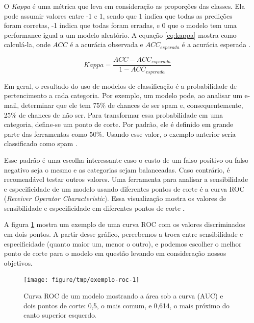 \documentclass[a4paper,titlepage]{ppgi}\usepackage[]{graphicx}\usepackage[]{color}
\newenvironment{knitrout}{}{} %
\begin{document}
O \emph{Kappa} é uma métrica que leva em consideração as proporções das
classes. Ela pode assumir valores entre -1 e 1, sendo que 1 indica que todas as
predições foram corretas, -1 indica que todas foram erradas, e 0 que o modelo
tem uma performance igual a um modelo aleatório. A equação \ref{eq:kappa}
mostra como calculá-la, onde $ACC$ é a acurácia observada e $ACC_{esperada}$ é
a acurácia esperada \cite{Cohen1960}.

\begin{equation}
\label{eq:kappa}
Kappa = \frac{ACC - ACC_{esperada}}{1 - ACC_{esperada}}
\end{equation}

Em geral, o resultado do uso de modelos de classificação é a probabilidade de
pertencimento a cada categoria. Por exemplo, um modelo pode, ao analisar um
e-mail, determinar que ele tem 75\% de chances de ser spam e, consequentemente,
25\% de chances de não ser. Para transformar essa probabilidade em uma
categoria, define-se um ponto de corte. Por padrão, ele é definido em grande
parte das ferramentas como 50\%. Usando esse valor, o exemplo anterior seria
classificado como spam \cite{Kuhn2013}.

Esse padrão é uma escolha interessante caso o custo de um falso positivo ou
falso negativo seja o mesmo e as categorias sejam balanceadas. Caso contrário,
é recomendável testar outros valores. Uma ferramenta para analisar a
sensibilidade e especificidade de um modelo usando diferentes pontos de corte é
a curva ROC (\emph{Receiver Operator Characteristic}). Essa visualização mostra
os valores de sensibilidade e especificidade em diferentes pontos de corte
\cite{Altman1994,Brown2006,Fawcett2006}.

A figura \ref{fig:exemplo-roc} mostra um exemplo de uma curva ROC com os
valores discriminados em dois pontos. A partir desse gráfico, percebemos a
troca entre sensibilidade e especificidade (quanto maior um, menor o outro), e
podemos escolher o melhor ponto de corte para o modelo em questão levando em
consideração nossos objetivos.

\begin{knitrout}
\color{fgcolor}\begin{figure}
\texttt{[image: figure/tmp/exemplo-roc-1]} \caption[Curva ROC de um modelo mostrando a área sob a curva (AUC) e dois pontos de corte]{Curva ROC de um modelo mostrando a área sob a curva (AUC) e dois pontos de corte: 0,5, o mais comum, e 0,614, o mais próximo do canto superior esquerdo.}\label{fig:exemplo-roc}
\end{figure}


\end{knitrout}
\end{document}
